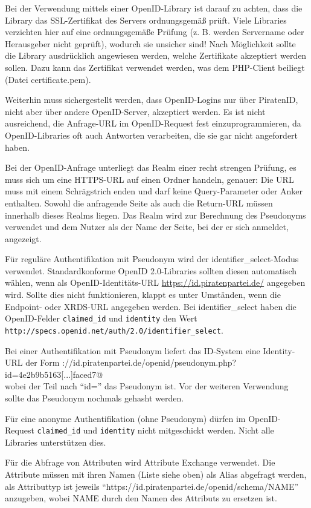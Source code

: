 \documentclass[parskip=half]{scrartcl}
\begin{document}
Bei der Verwendung mittels einer OpenID-Library ist darauf zu achten, dass die Library das SSL-Zertifikat des Servers ordnungsgemäß prüft.
Viele Libraries verzichten hier auf eine ordnungsgemäße Prüfung (z. B. werden Servername oder Herausgeber nicht geprüft), wodurch sie unsicher sind!
Nach Möglichkeit sollte die Library ausdrücklich angewiesen werden, welche Zertifikate akzeptiert werden sollen.
Dazu kann das Zertifikat verwendet werden, was dem PHP-Client beiliegt (Datei certificate.pem).

Weiterhin muss sichergestellt werden, dass OpenID-Logins nur über PiratenID, nicht aber über andere OpenID-Server, akzeptiert werden.
Es ist nicht ausreichend, die Anfrage-URL im OpenID-Request fest einzuprogrammieren,
da OpenID-Libraries oft auch Antworten verarbeiten, die sie gar nicht angefordert haben.

Bei der OpenID-Anfrage unterliegt das Realm einer recht strengen Prüfung, es muss sich um eine HTTPS-URL auf einen Ordner handeln, genauer:
Die URL muss mit einem Schrägstrich enden und darf keine Query-Parameter oder Anker enthalten.
Sowohl die anfragende Seite als auch die Return-URL müssen innerhalb dieses Realms liegen.
Das Realm wird zur Berechnung des Pseudonyms verwendet und dem Nutzer als der Name der Seite, bei der er sich anmeldet, angezeigt.

Für reguläre Authentifikation mit Pseudonym wird der identifier\_select-Modus verwendet.
Standardkonforme OpenID 2.0-Libraries sollten diesen automatisch wählen, wenn als OpenID-Identitäts-URL \url{https://id.piratenpartei.de/} angegeben wird.
Sollte dies nicht funktionieren, klappt es unter Umständen, wenn die Endpoint- oder XRDS-URL angegeben werden.
Bei identifier\_select haben die OpenID-Felder \texttt{claimed\_id} und \texttt{identity} den Wert \texttt{http://specs.openid.net/auth/2.0/identifier\_select}.

Bei einer Authentifikation mit Pseudonym liefert das ID-System eine Identity-URL der Form
\verb@https://id.piratenpartei.de/openid/pseudonym.php?id=4e2b9b5163[...]faced7@\\
wobei der Teil nach "`id="' das Pseudonym ist. Vor der weiteren Verwendung sollte das Pseudonym nochmals gehasht werden.

Für eine anonyme Authentifikation (ohne Pseudonym) dürfen im OpenID-Request \texttt{claimed\_id} und \texttt{identity} nicht mitgeschickt werden.
Nicht alle Libraries unterstützen dies.

Für die Abfrage von Attributen wird Attribute Exchange verwendet.
Die Attribute müssen mit ihren Namen (Liste siehe oben) als Alias abgefragt werden,
als Attributtyp ist jeweils "`https://id.piratenpartei.de/openid/schema/NAME"' anzugeben, wobei NAME durch den Namen des Attributs zu ersetzen ist.
\end{document}

